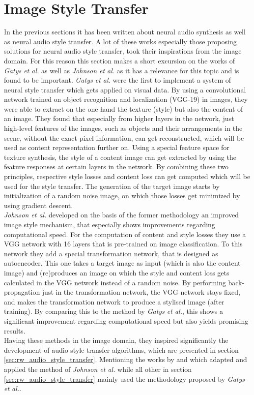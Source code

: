 \section{Image Style Transfer}
\label{sec:rw_imgstyletransfer}
In the previous sections it has been written about neural audio synthesis as well as neural audio style transfer. A lot of these works especially those proposing solutions for neural audio style transfer, took their inspirations from the image domain. For this reason this section makes a short excursion on the works of \textit{Gatys et al.} as well as \textit{Johnson et al.} as it has a relevance for this topic and is found to be important. \cite{Gatys2016, johnson2016perceptual} \textit{Gatys et al.} were the first to implement a system of neural style transfer which gets applied on visual data. By using a convolutional network trained on object recognition and localization (VGG-19) in images, they were able to extract on the one hand the texture (style) but also the content of an image. They found that especially from higher layers in the network, just high-level features of the images, such as objects and their arrangements in the scene, without the exact pixel information, can get reconstructed, which will be used as content representation further on. Using a special feature space for texture synthesis, the style of a content image can get extracted by using the feature responses at certain layers in the network. By combining these two principles, respective style losses and content loss can get computed which will be used for the style transfer. The generation of the target image starts by initialization of a random noise image, on which those losses get minimized by using gradient descent.\\
\textit{Johnson et al.} developed on the basis of the former methodology an improved image style mechanism, that especially shows improvements regarding computational speed. For the computation of content and style losses they use a VGG network with 16 layers that is pre-trained on image classification. To this network they add a special transformation network, that is designed as autoencoder. This one takes a target image as input (which is also the content image) and (re)produces an image on which the style and content loss gets calculated in the VGG network instead of a random noise. By performing back-propagation just in the transformation network, the VGG network stays fixed, and makes the transformation network to produce a stylised image (after training). By comparing this to the method by \textit{Gatys et al.}, this shows a significant improvement regarding computational speed but also yields promising results.\\
Having these methods in the image domain, they inspired significantly the development of audio style transfer algorithms, which are presented in section \ref{sec:rw_audio_style_transfer}. Mentioning the works by \cite{Ramani2018} and \cite{Liu2019} which adapted and applied the method of \textit{Johnson et al.} while all other in section \ref{sec:rw_audio_style_transfer} mainly used the methodology proposed by \textit{Gatys et al.}.